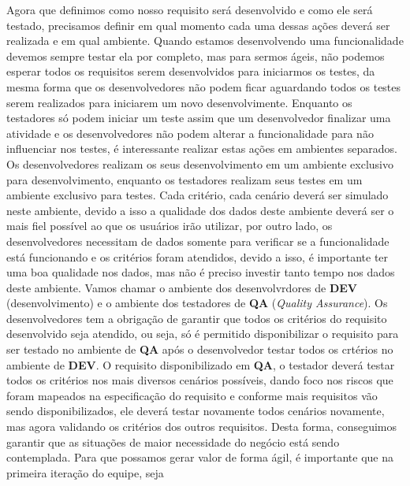       Agora que definimos como nosso requisito será desenvolvido e como ele será
      testado, precisamos definir em qual momento cada uma dessas ações deverá ser
      realizada e em qual ambiente. Quando estamos desenvolvendo uma funcionalidade
      devemos sempre testar ela por completo, mas para sermos ágeis, não podemos
      esperar todos os requisitos serem desenvolvidos para iniciarmos os testes,
      da mesma forma que os desenvolvedores não podem ficar aguardando todos os
      testes serem realizados para iniciarem um novo desenvolvimente. Enquanto os
      testadores só podem iniciar um teste assim que um desenvolvedor finalizar
      uma atividade e os desenvolvedores não podem alterar a funcionalidade para não
      influenciar nos testes, é interessante realizar estas ações em ambientes
      separados. Os desenvolvedores realizam os seus desenvolvimento em um ambiente
      exclusivo para desenvolvimento, enquanto os testadores realizam seus testes
      em um ambiente exclusivo para testes. Cada critério, cada cenário deverá ser
      simulado neste ambiente, devido a isso a qualidade dos dados deste ambiente
      deverá ser o mais fiel possível ao que os usuários irão utilizar, por outro
      lado, os desenvolvedores necessitam de dados somente para verificar se a
      funcionalidade está funcionando e os critérios foram atendidos, devido a isso,
      é importante ter uma boa qualidade nos dados, mas não é preciso investir
      tanto tempo nos dados deste ambiente. Vamos chamar o ambiente dos desenvolvrdores
      de \textbf{DEV} (desenvolvimento) e o ambiente dos testadores de \textbf{QA}
      (\textit{Quality Assurance}). \newline
      Os desenvolvedores tem a obrigação de garantir que todos os critérios do
      requisito desenvolvido seja atendido, ou seja, só é permitido disponibilizar
      o requisito para ser testado no ambiente de \textbf{QA} após o desenvolvedor
      testar todos os crtérios no ambiente de \textbf{DEV}. O requisito disponibilizado
      em \textbf{QA}, o testador deverá testar todos os critérios nos mais diversos
      cenários possíveis, dando foco nos riscos que foram mapeados na especificação
      do requisito e conforme mais requisitos vão sendo disponibilizados, ele deverá
      testar novamente todos cenários novamente, mas agora validando os critérios
      dos outros requisitos. Desta forma, conseguimos garantir que as situações de
      maior necessidade do negócio está sendo contemplada. Para que possamos gerar
      valor de forma ágil, é importante que na primeira iteração do equipe, seja
